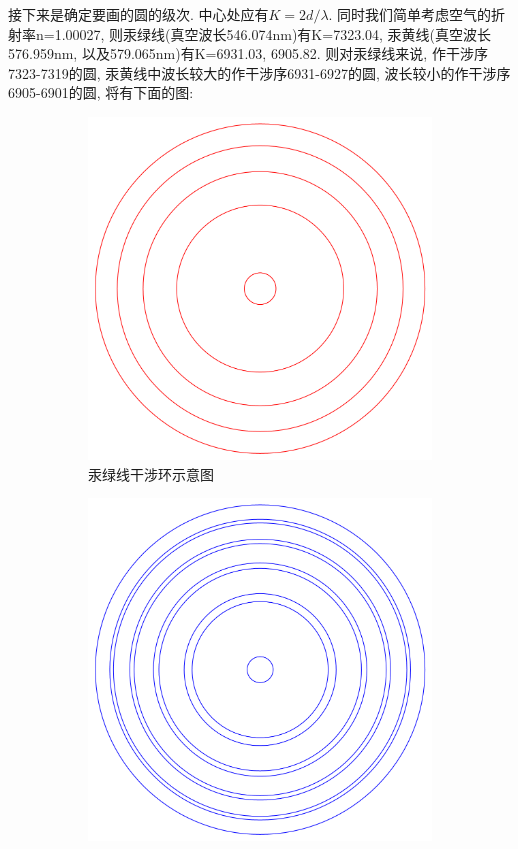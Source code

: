 \documentclass[12pt,a4paper]{article}
\begin{document}
接下来是确定要画的圆的级次. 中心处应有$K=2d/\lambda$. 同时我们简单考虑空气的折射率n=1.00027, 则汞绿线(真空波长546.074nm)有K=7323.04, 汞黄线(真空波长576.959nm, 以及579.065nm)有K=6931.03, 6905.82. 
则对汞绿线来说, 作干涉序7323-7319的圆, 汞黄线中波长较大的作干涉序6931-6927的圆, 波长较小的作干涉序6905-6901的圆, 将有下面的图: 
\begin{figure}[H]
    \centering
    \begin{subfigure}[b]{0.32\textwidth}
      \centering
      \includegraphics[width=\textwidth]{calc_g}
      \caption{汞绿线干涉环示意图}
    \end{subfigure}
    \hfill
    \begin{subfigure}[b]{0.32\textwidth}
      \centering
      \includegraphics[width=\textwidth]{calc_y}

\end{subfigure}
\end{figure}
\end{document}
